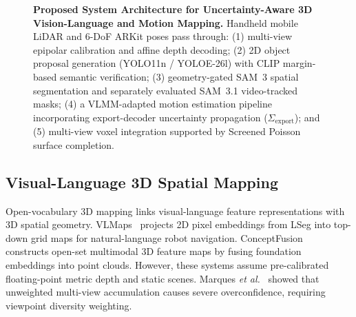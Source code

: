 \documentclass[conference]{IEEEtran}
\begin{document}
\begin{figure}[t]
\caption{\textbf{Proposed System Architecture for Uncertainty-Aware 3D Vision-Language and Motion Mapping.} Handheld mobile LiDAR and 6-DoF ARKit poses pass through: (1) multi-view epipolar calibration and affine depth decoding; (2) 2D object proposal generation (YOLO11n / YOLOE-26l) with CLIP margin-based semantic verification; (3) geometry-gated SAM~3 spatial segmentation and separately evaluated SAM~3.1 video-tracked masks; (4) a VLMM-adapted motion estimation pipeline incorporating export-decoder uncertainty propagation ($\Sigma_{\mathrm{export}}$); and (5) multi-view voxel integration supported by Screened Poisson surface completion.}
\label{fig:system_architecture}
\end{figure}

\subsection{Visual-Language 3D Spatial Mapping}
Open-vocabulary 3D mapping links visual-language feature representations with 3D spatial geometry. VLMaps~\cite{huang2023vlmaps} projects 2D pixel embeddings from LSeg into top-down grid maps for natural-language robot navigation. ConceptFusion~\cite{jatavallabhula2023conceptfusion} constructs open-set multimodal 3D feature maps by fusing foundation embeddings into point clouds. However, these systems assume pre-calibrated floating-point metric depth and static scenes. Marques \textit{et al.}~\cite{marques2024overconfidence} showed that unweighted multi-view accumulation causes severe overconfidence, requiring viewpoint diversity weighting.
\end{document}
